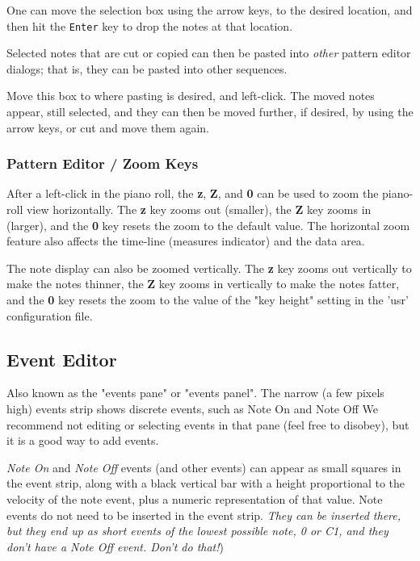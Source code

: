    One can move the selection box using the arrow keys, to the
   desired location, and then hit the
    \texttt{Enter} key to
   drop the notes at that location.

   Selected notes that are cut or copied can then be
   pasted into \textsl{other} pattern editor dialogs; that is, they can be
   pasted into other sequences.

   Move this box to where pasting is
   desired, and left-click.  The moved notes appear, still selected,
   and they can then be moved further, if desired, by using the arrow keys, or
   cut and move them again.

\subsubsection{Pattern Editor / Zoom Keys}
\label{subsubsec:pattern_editor_zoom_keys}

   After a left-click in the piano roll, the
   \textbf{z}, \textbf{Z}, and \textbf{0}
   can be used to zoom the piano-roll view horizontally.
   The \textbf{z} key zooms out (smaller),
   the \textbf{Z} key zooms in (larger),
   and the \textbf{0} key resets the zoom to the default value.
   The horizontal zoom feature also affects the time-line
   (measures indicator) and the data area.

   The note display can also be zoomed vertically.
   The \textbf{z} key zooms out vertically to make the notes thinner,
   the \textbf{Z} key zooms in vertically to make the notes fatter,
   and the \textbf{0} key resets the zoom to the value of the "key height"
   setting in the 'usr' configuration file.
   
\subsection{Event Editor}
\label{subsec:pattern_editor_events}

   Also known as the "events pane" or "events panel".
   The narrow (a few pixels high) events strip shows discrete events,
   such as Note On and Note Off
   We recommend not editing or selecting events
   in that pane (feel free to disobey), but it is a good way to add events.

   \textsl{Note On} and \textsl{Note Off} events (and other events) can appear
   as small squares in the event strip, along with a black vertical bar with a
   height proportional to the velocity of the note event, plus a numeric
   representation of that value.
   Note events do not need to be inserted in the event strip.
   \textsl{They can be inserted there, but they end up as short
   events of the lowest possible note, 0 or C1, and they don't have a Note
   Off event.  Don't do that!})

